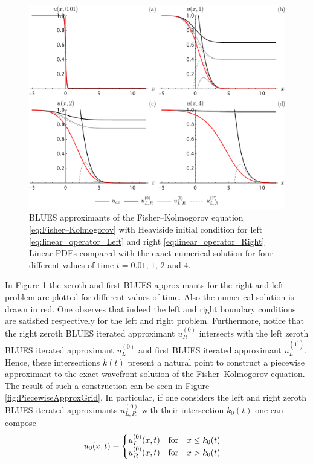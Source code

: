 \documentclass[amsmath,amssymb,amsfonts,aps,pre,preprint,superscriptaddress,bibnotes,showpacs,showkeys,longbibliography]{revtex4-1}
\begin{document}
\begin{figure}[!ht]
    \centering
    \includegraphics[width=\linewidth]{Figures/GridU1.pdf}
    \caption{BLUES approximants of the Fisher–Kolmogorov equation \eqref{eq:Fisher–Kolmogorov} with Heaviside initial condition for left \eqref{eq:linear_operator_Left} and right \eqref{eq:linear_operator_Right} Linear PDEs compared with the exact numerical solution for four different values of time $t=0.01,\, 1,\, 2$ and $4$.}
    \label{fig:GridU1}
\end{figure}
In Figure \ref{fig:GridU1} the zeroth and first BLUES approximants for the right and left problem are plotted for different values of time. Also the numerical solution is drawn in red. One observes that indeed the left and right boundary conditions are satisfied respectively for the left and right problem. Furthermore, notice that the right zeroth BLUES iterated approximant $u^{(0)}_R$ intersects with the left zeroth BLUES iterated approximant $u^{(0)}_L$ and first BLUES iterated approximant $u^{(1^\prime)}_L$. Hence, these intersections $k(t)$ present a natural point to construct a piecewise approximant to the exact wavefront solution of the Fisher–Kolmogorov equation. The result of such a construction can be seen in Figure \ref{fig:PiecewiseApproxGrid}. In particular, if one considers the left and right zeroth BLUES iterated approximants $u^{(0)}_{L,R}$ with their intersection $k_0(t)$ one can compose
\begin{align}
    u_0(x,t)\equiv
    \begin{cases}
    u^{(0)}_{L}(x,t) \qq{for} x\leq k_0(t)\\
    u^{(0)}_{R}(x,t) \qq{for} x>k_0(t)
    \end{cases}
\end{align}
\end{document}
